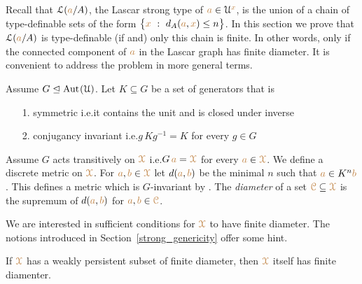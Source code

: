 Recall that $\EuScript L({\color{brown} a}/A)$, the Lascar strong type of ${\color{brown} a}\in\EuScript U^{\color{brown} x}$, is the union of a chain of type-definable sets of the form $\big\{{\color{brown} x}\ :\ d_A({\color{brown} a},{\color{brown} x})\le n\big\}$.
In this section we prove that $\EuScript L({\color{brown} a}/A)$ is type-definable (if and) only this chain is finite.
In other words, only if the connected component of ${\color{brown} a}$ in the Lascar graph has finite diameter.
It is convenient to address the problem in more general terms.

Assume $G\trianglelefteq{\rm Aut\kern.15ex}(\EuScript U)$.
Let $K\subseteq G$ be a set of generators that is
\begin{itemize}
  \item[1.] symmetric i.e.\@ it contains the unit and is closed under inverse
  \item[2.] conjugancy invariant i.e.\@ $g\,Kg^{-1}=K$ for every $g\in G$
\end{itemize}

Assume $G$ acts transitively on ${\color{brown}\EuScript X}$ i.e.\@ $G\,{\color{brown} a}={\color{brown}\EuScript X}$ for every ${\color{brown} a}\in{\color{brown}\EuScript X}$.
We define a discrete metric on ${\color{brown}\EuScript X}$.
For ${\color{brown} a},{\color{brown} b}\in{\color{brown}\EuScript X}$ let $d({\color{brown} a},{\color{brown} b})$ be the minimal $n$ such that ${\color{brown} a}\in K^n{\color{brown} b}$.
This defines a metric which is $G$-invariant by .
The \emph{diameter\/} of a set ${\color{brown}\EuScript C}\subseteq{\color{brown}\EuScript X}$ is the supremum of $d({\color{brown} a},{\color{brown} b})$ for ${\color{brown} a},{\color{brown} b}\in{\color{brown}\EuScript C}$.

We are interested in sufficient conditions for ${\color{brown}\EuScript X}$ to have finite diameter.
The notions introduced in Section~\ref{strong_genericity} offer some hint.

\begin{proposition}\label{prop_wpers_finite_diameter}
  If ${\color{brown}\EuScript X}$ has a weakly persistent subset of finite diameter, then ${\color{brown}\EuScript X}$ itself has finite diamenter.
\end{proposition}

